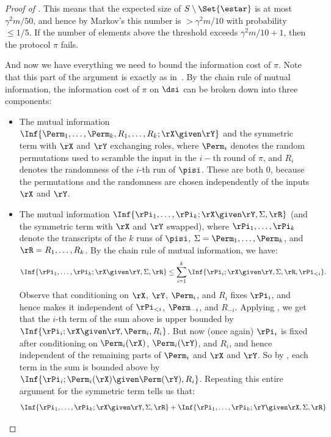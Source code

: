 \begin{proof}[Proof of ]
This means that the expected size of $S \setminus \Set{\estar}$ is at most
$\gamma^2 m / 50$, and hence by Markov's this number is $> \gamma^2 m / 10$
with probability $\leq 1/5$.
If the number of elements above the threshold exceeds $\gamma^2 m / 10 + 1$,
then the protocol $\pi$ fails.

And now we have everything we need to bound the information cost of $\pi$.
Note that this part of the argument is exactly as in~\cite{AssadiR20}.
By the chain rule of mutual information, the information cost of $\pi$
on $\dsi$ can be broken down into three components:
\begin{itemize}
  \item The mutual information
    $\Inf{\Perm_1, \ldots , \Perm_k, R_1, \ldots , R_k ; \rX \given \rY}$
    and the symmetric term with $\rX$ and $\rY$ exchanging roles,
    where $\Perm_i$ denotes the random permutations used to scramble the input
    in the $i-$th round of $\pi$, and $R_i$ denotes the randomness of the
    $i$-th run of $\pisi$.
    These are both $0$, because the permutations and the randomness are chosen
    independently of the inputs $\rX$ and $\rY$.
  \item The mutual information
    $\Inf{\rPi_1, \ldots , \rPi_k ; \rX \given \rY, \Sigma, \rR}$
    (and the symmetric term with $\rX$ and $\rY$ swapped), where
    $\rPi_1, \ldots , \rPi_k$ denote the transcripts of the $k$ runs
    of $\pisi$, $\Sigma = \Perm_1, \ldots , \Perm_k$, and
    $\rR = R_1, \ldots , R_k$.
    By the chain rule of mutual information, we have:
    \[ \Inf{\rPi_1, \ldots , \rPi_k ; \rX \given \rY, \Sigma, \rR}
      \leq \sum_{i = 1}^k \Inf{\rPi_i ; \rX \given \rY, \Sigma, \rR, \rPi_{< i}}.
    \]
    Observe that conditioning on $\rX$, $\rY$, $\Perm_i$, and $R_i$ fixes
    $\rPi_i$, and hence makes it independent of $\rPi_{< i}$, $\Perm_{-i}$,
    and $R_{-i}$.
    Applying , we get that the $i$-th term of the
    sum above is upper bounded by $\Inf{\rPi_i ; \rX \given \rY, \Perm_i, R_i}$.
    But now (once again) $\rPi_i$ is fixed after conditioning on $\Perm_i(\rX)$,
    $\Perm_i(\rY)$, and $R_i$, and hence independent of the remaining parts
    of $\Perm_i$ and $\rX$ and $\rY$.
    So by , each term in the sum is bounded above by
    $\Inf{\rPi_i ; \Perm_i(\rX) \given \Perm(\rY), R_i}$.
    Repeating this entire argument for the symmetric term tells us that:
    \[ \Inf{\rPi_1, \ldots , \rPi_k ; \rX \given \rY, \Sigma, \rR} +
      \Inf{\rPi_1, \ldots , \rPi_k ; \rY \given \rX, \Sigma, \rR}
\]
\end{itemize}
\end{proof}
